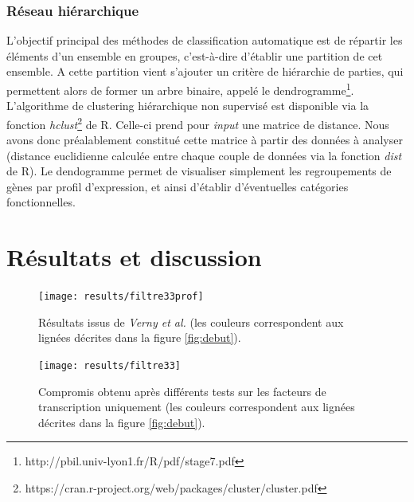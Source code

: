 \documentclass[fleqn,11pt]{SelfArx} %
\begin{document}
\subsubsection{Réseau hiérarchique}
L’objectif principal des méthodes de classification automatique est de répartir les éléments d’un ensemble en groupes, c'est-à-dire d’établir une partition de cet ensemble.
A cette partition vient s'ajouter un critère de hiérarchie de parties, qui permettent alors de former un arbre binaire, appelé le dendrogramme\footnote{http://pbil.univ-lyon1.fr/R/pdf/stage7.pdf}. L'algorithme de clustering hiérarchique non supervisé est disponible via la fonction \textit{hclust}\footnote{https://cran.r-project.org/web/packages/cluster/cluster.pdf} de R. Celle-ci prend pour \textit{input} une matrice de distance. Nous avons donc préalablement constitué cette matrice à partir des données à analyser (distance euclidienne calculée entre chaque couple de données via la fonction \textit{dist} de R). Le dendogramme permet de visualiser simplement les regroupements de gènes par profil d'expression, et ainsi d'établir d'éventuelles catégories fonctionnelles.




\section{Résultats et discussion}

\begin{figure}[ht]
\centering
\texttt{[image: results/filtre33prof]}
\caption{Résultats issus de \textit{Verny et al.} (les couleurs correspondent aux lignées décrites dans la figure \ref{fig:debut}).}
\label{fig:filtre33prof}
\end{figure}


\begin{figure}[ht]
\centering
\texttt{[image: results/filtre33]}
\caption{Compromis obtenu après différents tests sur les facteurs de transcription uniquement (les couleurs correspondent aux lignées décrites dans la figure \ref{fig:debut}).}
\label{fig:filtre33}
\end{figure}
\end{document}
